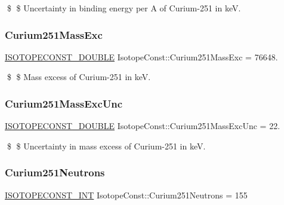 \$ \$ Uncertainty in binding energy per A of Curium-\/251 in keV. \mbox{\label{group___isotope_const-_curium-_cm251_ga1843538e8623aa1826f7082df5bde25b}} 
\subsubsection{\texorpdfstring{Curium251\+Mass\+Exc}{Curium251MassExc}}
{\footnotesize\ttfamily \mbox{\hyperlink{group___isotope_const-_macros_ga8f45a7272ce02c0b4c65c44636ed719a}{I\+S\+O\+T\+O\+P\+E\+C\+O\+N\+S\+T\+\_\+\+D\+O\+U\+B\+LE}} Isotope\+Const\+::\+Curium251\+Mass\+Exc = 76648.}

\$ \$ Mass excess of Curium-\/251 in keV. \mbox{\label{group___isotope_const-_curium-_cm251_ga812cfaf6d19f2ccd9fd9885dea370c23}} 
\subsubsection{\texorpdfstring{Curium251\+Mass\+Exc\+Unc}{Curium251MassExcUnc}}
{\footnotesize\ttfamily \mbox{\hyperlink{group___isotope_const-_macros_ga8f45a7272ce02c0b4c65c44636ed719a}{I\+S\+O\+T\+O\+P\+E\+C\+O\+N\+S\+T\+\_\+\+D\+O\+U\+B\+LE}} Isotope\+Const\+::\+Curium251\+Mass\+Exc\+Unc = 22.}

\$ \$ Uncertainty in mass excess of Curium-\/251 in keV. \mbox{\label{group___isotope_const-_curium-_cm251_gac373fdadebd66e17d27a042420c205f0}} 
\subsubsection{\texorpdfstring{Curium251\+Neutrons}{Curium251Neutrons}}
{\footnotesize\ttfamily \mbox{\hyperlink{group___isotope_const-_macros_ga5f18360b3e99483a35c32d789e62621c}{I\+S\+O\+T\+O\+P\+E\+C\+O\+N\+S\+T\+\_\+\+I\+NT}} Isotope\+Const\+::\+Curium251\+Neutrons = 155}

